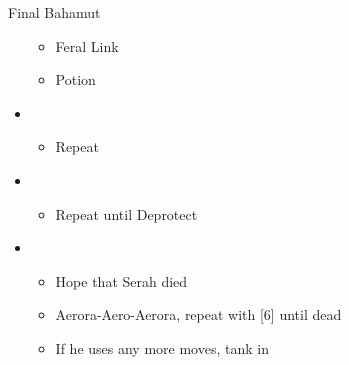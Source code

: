 \begin{battle}{Final Bahamut}
\begin{flushleft}
\begin{itemize}
\begin{itemize}
              \item Feral Link
              \item Potion
            \end{itemize}
      \item \sixth
            \begin{itemize}
              \item Repeat
            \end{itemize}
      \item \third
            \begin{itemize}
              \item Repeat until Deprotect
            \end{itemize}
      \item \fifth
            \begin{itemize}
              \item Hope that Serah died
              \item Aerora-Aero-Aerora, repeat with [6] until dead
              \item If he uses any more moves, tank in \fourth
            \end{itemize}
    \end{itemize}
  \end{flushleft}
\end{battle}


